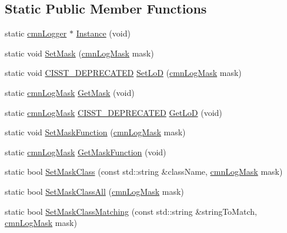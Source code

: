 \subsection*{Static Public Member Functions}
\begin{DoxyCompactItemize}
\item 
static \hyperlink{classcmn_logger}{cmn\-Logger} $\ast$ \hyperlink{classcmn_logger_af147d525d01803626e171c328bc28530}{Instance} (void)
\item 
static void \hyperlink{classcmn_logger_aa1b05cddbe0f496c381453656a21af7d}{Set\-Mask} (\hyperlink{cmn_log_lo_d_8h_a44b6ef7560b0d204460b0a54f1a5d702}{cmn\-Log\-Mask} mask)
\item 
static void \hyperlink{cmn_portability_8h_a63da7164735f9501be651b1f2bbc0121}{C\-I\-S\-S\-T\-\_\-\-D\-E\-P\-R\-E\-C\-A\-T\-E\-D} \hyperlink{classcmn_logger_af1c8a409a0667a9abb6003c3e89a82c4}{Set\-Lo\-D} (\hyperlink{cmn_log_lo_d_8h_a44b6ef7560b0d204460b0a54f1a5d702}{cmn\-Log\-Mask} mask)
\item 
static \hyperlink{cmn_log_lo_d_8h_a44b6ef7560b0d204460b0a54f1a5d702}{cmn\-Log\-Mask} \hyperlink{classcmn_logger_a96c349facac6bbc27220b091ff26a838}{Get\-Mask} (void)
\item 
static \hyperlink{cmn_log_lo_d_8h_a44b6ef7560b0d204460b0a54f1a5d702}{cmn\-Log\-Mask} \hyperlink{cmn_portability_8h_a63da7164735f9501be651b1f2bbc0121}{C\-I\-S\-S\-T\-\_\-\-D\-E\-P\-R\-E\-C\-A\-T\-E\-D} \hyperlink{classcmn_logger_aa971af396f5e242a175d9b54be9064c5}{Get\-Lo\-D} (void)
\item 
static void \hyperlink{classcmn_logger_afa246173cc26b1fa0bac407842dfd31c}{Set\-Mask\-Function} (\hyperlink{cmn_log_lo_d_8h_a44b6ef7560b0d204460b0a54f1a5d702}{cmn\-Log\-Mask} mask)
\item 
static \hyperlink{cmn_log_lo_d_8h_a44b6ef7560b0d204460b0a54f1a5d702}{cmn\-Log\-Mask} \hyperlink{classcmn_logger_ac9a9ba32485a733c51bc7927f76b2355}{Get\-Mask\-Function} (void)
\item 
static bool \hyperlink{classcmn_logger_ac02d8a05e26687bf66951aab021adad7}{Set\-Mask\-Class} (const std\-::string \&class\-Name, \hyperlink{cmn_log_lo_d_8h_a44b6ef7560b0d204460b0a54f1a5d702}{cmn\-Log\-Mask} mask)
\item 
static bool \hyperlink{classcmn_logger_a88413527ca33537b0d13d1a9645c46a4}{Set\-Mask\-Class\-All} (\hyperlink{cmn_log_lo_d_8h_a44b6ef7560b0d204460b0a54f1a5d702}{cmn\-Log\-Mask} mask)
\item 
static bool \hyperlink{classcmn_logger_ae835d053611487f98a3d216ca8ca6f28}{Set\-Mask\-Class\-Matching} (const std\-::string \&string\-To\-Match, \hyperlink{cmn_log_lo_d_8h_a44b6ef7560b0d204460b0a54f1a5d702}{cmn\-Log\-Mask} mask)

\end{DoxyCompactItemize}
